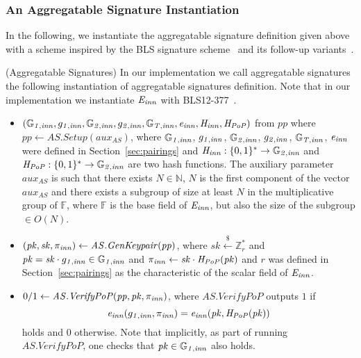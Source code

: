 \subsubsection{An Aggregatable Signature Instantiation}
\label{sec:bls}
\noindent In the following, we instantiate the aggregatable signature definition given above with a scheme inspired by the BLS signature
scheme~\cite{BLS_signatures} and its follow-up variants~\cite{proofs_of_posession,boneh_compact_multisig}.

\begin{construction}(Aggregatable Signatures) 
\label{insta:bls}
In our implementation we call aggregatable signatures the following 
instantiation of aggregatable signatures definition. Note that in our implementation we instantiate $\mathit{E}_{\mathit{inn}}$ with BLS12-377~\cite{zexe}.
\begin{itemize}
\item $(\mathbb{G}_{\mathit{1,inn}}, g_{\mathit{1,inn}}, \mathbb{G}_{\mathit{2,inn}}, g_{\mathit{2,inn}}, \mathbb{G}_{\mathit{T,inn}}, \mathit{e}_{\mathit{inn}}, \mathit{H}_{\mathit{inn}}, \mathit{H}_{\mathit{PoP}})$ from $\mathit{pp}$ where 
$\mathit{pp} \leftarrow  \mathit{AS.Setup}(\mathit{aux_{\mathit{AS}}})$, 
where $\mathbb{G}_{\mathit{1,inn}}$, $g_{\mathit{1,inn}}$, $\mathbb{G}_{\mathit{2,inn}}$, $g_{\mathit{2,inn}}$, $\mathbb{G}_{\mathit{T,inn}}$, $\mathit{e}_{\mathit{inn}}$ were defined in Section~\ref{sec:pairings} and 
$\mathit{H}_{\mathit{inn}}: \{0,1\}^* \rightarrow \mathbb{G}_{\mathit{2,inn}}$ and $\mathit{H}_{\mathit{PoP}}: \{0,1\}^* \rightarrow \mathbb{G}_{\mathit{2,inn}}$ are two hash functions. 
The auxiliary parameter $\mathit{aux_{\mathit{AS}}}$ is such that there exists $N \in \mathbb{N}$, 
$N$ is the first component of the vector $\mathit{aux_{\mathit{AS}}}$ and there exists a subgroup of size at least $N$ in the multiplicative group of $\mathbb{F}$, where $\mathbb{F}$ 
is the base field of $\mathit{E}_{\mathit{inn}}$, but also the size of the subgroup $\in O(N)$.

\item $(\mathit{pk},\mathit{sk}, \pi_{\mathit{inn}}) \leftarrow \mathit{AS.GenKeypair}(\mathit{pp})$, where $\mathit{sk} \xleftarrow{\$} \mathbb{Z}_{r}^{*}$  
and $\mathit{pk} = \mathit{sk} \cdot g_{\mathit{1,inn}} \in \mathbb{G}_{\mathit{1,inn}}$ and $\pi_{\mathit{inn}} \leftarrow {\mathit{sk}} \cdot \mathit{H}_{\mathit{PoP}}(\mathit{pk})$ 
and $r$ was defined in Section~\ref{sec:pairings} as the characteristic of the scalar field of $\mathit{E}_{\mathit{inn}}$.

\item $0/1 \leftarrow \mathit{AS.VerifyPoP}(\mathit{pp}, \mathit{pk}, \pi_{\mathit{inn}})$, where $\mathit{AS.VerifyPoP}$ outputs $1$ if 
$$\mathit{e}_{\mathit{inn}}( g_{\mathit{1,inn}}, \pi_{\mathit{inn}}) = \mathit{e}_{\mathit{inn}}(\mathit{pk}, \mathit{H}_{\mathit{PoP}}(\mathit{pk}))$$ holds and $0$ otherwise. Note that implicitly, as part of running \\
$\mathit{AS.VerifyPoP}$, one checks that $\mathit{pk} \in \mathbb{G}_{\mathit{1,inn}}$ also holds.


\end{itemize}
\end{construction}

